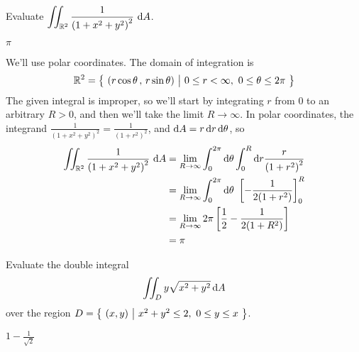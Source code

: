 \begin{question}[M200 2009A] %
Evaluate $\displaystyle \iint_{\mathbb{R}^2} \frac{1}{{(1+x^2+y^2)}^2}\ \mathrm{d}A$.
\end{question}

%

\begin{answer}
$\pi$
\end{answer}

\begin{solution}
We'll use polar coordinates. The domain of integration is
\begin{equation*}
\bbbr^2=\Set{(r\cos\theta\,,\,r\sin\theta)}{0\le r<\infty,\ 
                       0\le\theta\le 2\pi}
\end{equation*}
The given integral is improper, so we'll start by integrating $r$ from $0$
to an arbitrary $R>0$, and then we'll take the limit $R\rightarrow\infty$.
In polar coordinates, the integrand
$\frac{1}{{(1+x^2+y^2)}^2}=\frac{1}{{(1+r^2)}^2}$, and
 $\mathrm{d}A=r\,\mathrm{d}r\,\mathrm{d}\theta$, so
\begin{align*}
\dblInt_{\bbbr^2} \frac{1}{{(1+x^2+y^2)}^2}\ \dee{A}
&=\lim_{R\rightarrow\infty} \int_0^{2\pi}\dee{\theta}\int_0^R\dee{r}
                  \frac{r}{{(1+r^2)}^2} \\
&=\lim_{R\rightarrow\infty} \int_0^{2\pi}\dee{\theta}\ 
                      \left[-\frac{1}{2(1+r^2)}\right]_0^R \\
&=\lim_{R\rightarrow\infty} 2\pi
                      \left[\frac{1}{2}-\frac{1}{2(1+R^2)}\right] \\
&=\pi
\end{align*}
\end{solution}

\begin{question}[M200 2011D] %
Evaluate the double integral
\begin{equation*}
\iint_D y\sqrt{x^2+y^2}\,\mathrm{d}A
\end{equation*}
over the region
$D =\big\{ \ (x,y)\ \big|\  x^2+y^2\le 2,\ 0\le y\le x\ \big\}$.
\end{question}

%

\begin{answer}
$1-\frac{1}{\sqrt{2}}$
\end{answer}

